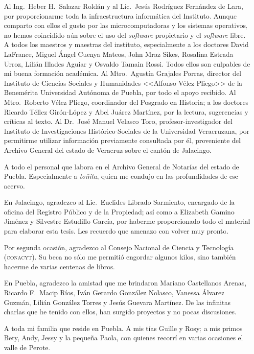 \documentclass[14pt,twoside,final]{extbook} %
\begin{document}
Al Ing.~Heber H.~Salazar Roldán y al Lic.~Jesús Rodríguez Fernández de Lara, por proporcionarme toda la infraestructura informática del Instituto. Aunque comparto con ellos el gusto por las microcomputadoras y los sistemas operativos, no hemos coincidido aún sobre el uso del \emph{software} propietario y el \emph{software} libre. A todos los maestros y maestras del instituto, especialmente a los doctores David LaFrance, Miguel Ángel Cuenya Mateos, John Mraz Sikes, Rosalina Estrada Urroz, Lilián Illades Aguiar y Osvaldo Tamain Rossi. Todos ellos son culpables de mi buena formación académica. Al Mtro.~Agustín Grajales Porras, director del Instituto de Ciencias Sociales y Humanidades <<Alfonso Vélez Pliego>> de la Benemérita Universidad Autónoma de Puebla, por todo el apoyo recibido. Al Mtro.~Roberto Vélez Pliego, coordinador del Posgrado en Historia; a los doctores Ricardo Téllez Girón-López y Abel Juárez Martínez, por la lectura, sugerencias y críticas al texto. Al Dr.~José Manuel Velasco Toro, profesor-investigador del Instituto de Investigaciones Histórico-Sociales de la Universidad Veracruzana, por permitirme utilizar información previamente consultada por él, proveniente del Archivo General del estado de Veracruz sobre el cantón de Jalacingo.

A todo el personal que labora en el Archivo General de Notarías del estado de Puebla. Especialmente a \emph{toñita}, quien me condujo en las profundidades de ese acervo.

En Jalacingo, agradezco al Lic.~Euclides Librado Sarmiento, encargado de la oficina del Registro Público y de la Propiedad; así como a Elizabeth Gamino Jiménez y Silvestre Estudillo García, por haberme proporcionado todo el material para elaborar esta tesis. Les recuerdo que amenazo con volver muy pronto.

Por segunda ocasión, agradezco al Consejo Nacional de Ciencia y Tecnología (\textsc{conacyt}). Su beca no sólo me permitió engordar algunos kilos, sino también hacerme de varias centenas de libros.

En Puebla, agradezco la amistad que me brindaron Mariano Castellanos Arenas, Ricardo F.~Macip Ríos, Iván Gerardo González Nolasco, Vanessa Álvarez Guzmán, Lilián González Torres y Jesús Guevara Martínez. De las infinitas charlas que he tenido con ellos, han surgido proyectos y no pocas discusiones.

A toda mi familia que reside en Puebla. A mis tías Guille y Rosy; a mis primos Bety, Andy, Jessy y la pequeña Paola, con quienes recorrí en varias ocasiones el valle de Perote.
\end{document}
